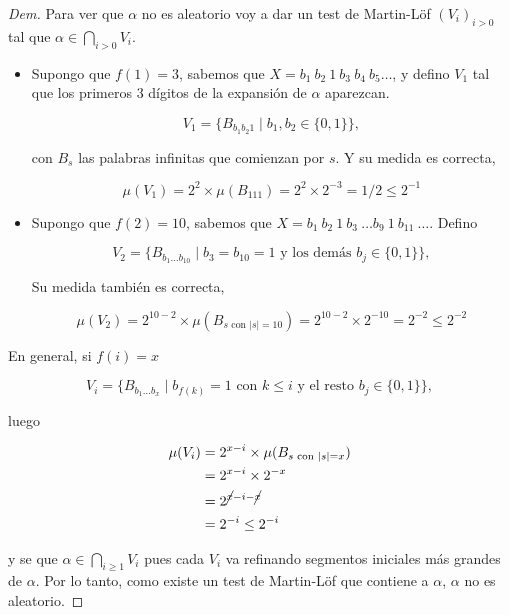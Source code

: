\documentclass{article}
\theoremstyle{definition} %
\newcommand{\measure}[1]{\mu(#1)}
\begin{document}
\begin{proof}[Dem]
    Para ver que $\alpha$ no es aleatorio voy a dar un test de Martin-Löf
    $(V_i)_{i > 0}$ tal que $\alpha \in \bigcap_{i > 0} V_i$.

    \begin{itemize}
        \item Supongo que $f(1) = 3$, sabemos que $X = b_1\ b_2\ 1\ b_3\ b_4\ b_5
        \dots$, y defino $V_1$ tal que los primeros 3 dígitos de la expansión de
        $\alpha$ aparezcan.

        \[
            V_1 = \{ 
                B_{b_1 b_2 1}
                \mid b_1, b_2 \in \{0, 1\}
            \},
        \]

        con $B_s$ las palabras infinitas que comienzan por $s$. Y su medida es
        correcta,

        \[
            \measure{V_1}
                = 2^2 \times \measure{B_{111}}
                = 2^2 \times 2^{-3} = 1/2
                \leq 2^{-1}
        \]

        \item Supongo que $f(2) = 10$, sabemos que 
        $X = b_1\ b_2\ 1\ b_3\ \dots b_9\ 1\ b_{11}\ \dots$. Defino

        \[
            V_2 = \{ 
                B_{b_1 \dots b_{10}}
                \mid b_3 = b_{10} = 1 \text{ y los demás } b_j \in \{0, 1\}
            \},
        \]

        Su medida también es correcta,

        \[
            \measure{V_2}
                = 2^{10 - 2} \times \measure{B_{s \text{ con } |s| = 10}}
                = 2^{10 - 2} \times 2^{-10} = 2^{-2}
                \leq 2^{-2}
        \]
    \end{itemize}

    En general, si $f(i) = x$

    \[
        V_i = \{ 
            B_{b_1 \dots b_{x}}
            \mid b_{f(k)} = 1 \text{ con } k \leq i \text{ y el resto } b_j \in \{0, 1\}
        \},
    \]

    luego

    \begin{align*}
        \measure{V_i}
            &= 2^{x - i} \times \measure{B_{s \text{ con } |s| = x}} \\
            &= 2^{x - i} \times 2^{-x} \\
            &= 2^{\cancel{x} - i - \cancel{x}} \\
            &= 2^{-i} \leq 2^{-i}
    \end{align*}

    y se que $\alpha \in \bigcap_{i \geq 1} V_i$ pues cada $V_i$ va refinando
    segmentos iniciales más grandes de $\alpha$. Por lo tanto, como existe un
    test de Martin-Löf que contiene a $\alpha$, $\alpha$ no es aleatorio.
\end{proof}
\end{document}
